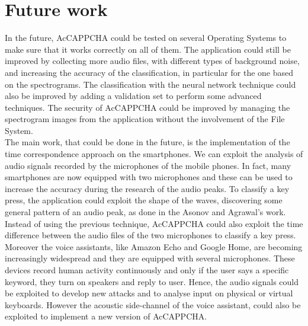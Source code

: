 \chapter{Future work}\label{chapter:Future}
In the future, AcCAPPCHA could be tested on several Operating Systems to make sure that it works correctly on all of them. The application could still be improved by collecting more audio files, with different types of background noise, and increasing the accuracy of the classification, in particular for the one based on the spectrograms. The classification with the neural network technique could also be improved by adding a validation set to perform some advanced techniques. The security of AcCAPPCHA could be improved by managing the spectrogram images from the application without the involvement of the File System.\\
The main work, that could be done in the future, is the implementation of the time correspondence approach on the smartphones. We can exploit the analysis of audio signals recorded by the microphones of the mobile phones. In fact, many smartphones are now equipped with two microphones and these can be used to increase the accuracy during the research of the audio peaks. To classify a key press, the application could exploit the shape of the waves, discovering some general pattern of an audio peak, as done in the Asonov and Agrawal's work\cite{keyboard_acoustic}. Instead of using the previous technique, AcCAPPCHA could also exploit the time difference between the audio files of the two microphones to classify a key press\cite{smartphone_acoustic}.\\
Moreover the voice assistants, like Amazon Echo and Google Home, are becoming increasingly widespread and they are equipped with several microphones. These devices record human activity continuously and only if the user says a specific keyword, they turn on speakers and reply to user. Hence, the audio signals could be exploited to develop new attacks and to analyse input on physical or virtual keyboards\cite{voice_assistant}. However the acoustic side-channel of the voice assistant, could also be exploited to implement a new version of AcCAPPCHA.\\